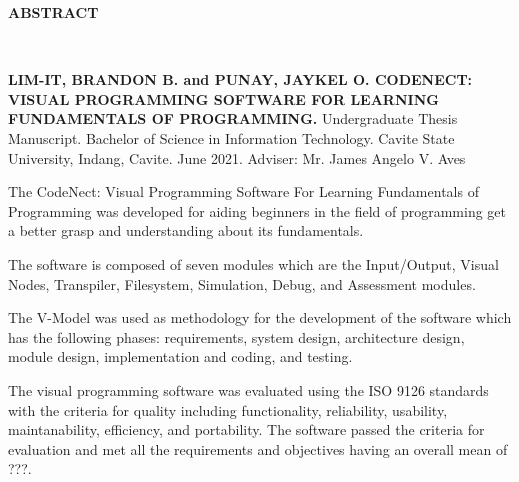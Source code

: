 \begin{doublespace}
	\thispagestyle{empty}

	\begin{center}
		\textbf{ABSTRACT}
	\end{center}
	\leavevmode\\

	\begin{singlespace}
		\parbox{\textwidth}{
		\justify
		\textbf{LIM-IT, BRANDON B. and PUNAY, JAYKEL O. CODENECT: VISUAL
		PROGRAMMING SOFTWARE FOR LEARNING FUNDAMENTALS OF PROGRAMMING.}
		Undergraduate Thesis Manuscript.  Bachelor of Science in Information
		Technology. Cavite State University, Indang, Cavite. June 2021. Adviser: Mr.
		James Angelo V. Aves}
	\end{singlespace}

	\justify
	\hphantom{}

	\parx
	The CodeNect: Visual Programming Software For Learning Fundamentals of
	Programming was developed for aiding beginners in the field of programming
	get a better grasp and understanding about its fundamentals.

	\parx
	The software is composed of seven modules which are the Input/Output, Visual
	Nodes, Transpiler, Filesystem, Simulation, Debug, and Assessment modules.

	\parx
	The V-Model was used as methodology for the development of the software which
	has the following phases: requirements, system design, architecture design, module
	design, implementation and coding, and testing.

	\parx
	The visual programming software was evaluated using the ISO 9126 standards with the
	criteria for quality including functionality, reliability, usability, maintanability,
	efficiency, and portability. The software passed the criteria for evaluation and met
	all the requirements and objectives having an overall mean of ???.
\end{doublespace}
